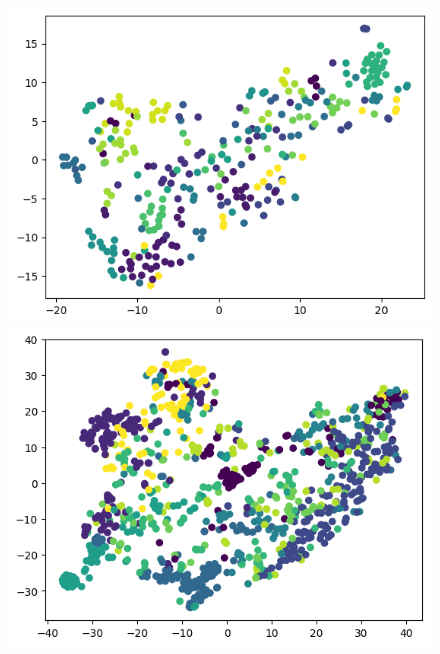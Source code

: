 \begin{figure}[htbp]
{\begin{minipage}[b]{.48\linewidth}
\includegraphics[scale=0.2]{cluster/MomoTenKuu_sc.png}
\end{minipage}
\begin{minipage}[b]{.48\linewidth}
\centering
\includegraphics[scale=0.2]{cluster/mamedachamesuke_sc.png}
\end{minipage}}
\end{figure}
